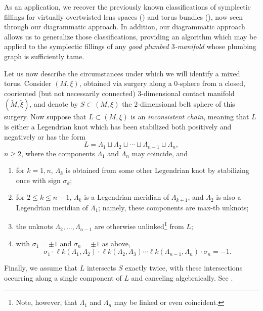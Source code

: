 \documentclass[11pt]{amsart}
\numberwithin{equation}{section}
\theoremstyle{plain}
\theoremstyle{definition}
\theoremstyle{remark}\newtheorem{rem}[equation]{Remark}%
\theoremstyle{remark}\newtheorem{obs}[equation]{Observation}%
\begin{document}
As an application, we recover the previously known classifications of symplectic fillings for virtually overtwisted lens spaces (\cite{etnyre2021symplectic,christian2023some}) and torus bundles (\cite{christian2021symplectic}), now seen through our diagrammatic approach.  In addition, our diagrammatic approach allows us to generalize those classifications, providing an algorithm which may be applied to the symplectic fillings of any \emph{good plumbed $3$-manifold} whose plumbing graph is sufficiently tame.

Let us now describe the circumstances under which we will identify a mixed torus.  Consider $(M,\xi)$, obtained via surgery along a 0-sphere from a closed, cooriented (but not necessarily connected) 3-dimensional contact manifold $(\tilde{M},\tilde{\xi})$, and denote by $S\subset (M,\xi)$ the 2-dimensional belt sphere of this surgery.  Now suppose that $L\subset(M,\xi)$ is an \emph{inconsistent chain}, meaning that $L$ is either a Legendrian knot which has been stabilized both positively and negatively or has the form
\[
L = \Lambda_1\sqcup \Lambda_2\sqcup\cdots\sqcup \Lambda_{n-1}\sqcup \Lambda_{n},
\]
$n\geq 2$, where the components $\Lambda_1$ and $\Lambda_n$ may coincide, and
\begin{enumerate}
    \item for $k=1,n$, $\Lambda_k$ is obtained from some other Legendrian knot by stabilizing once with sign $\sigma_k$;

    \item for $2\leq k\leq n-1$, $\Lambda_k$ is a Legendrian meridian of $\Lambda_{k+1}$, and $\Lambda_2$ is also a Legendrian meridian of $\Lambda_1$; namely, these components are max-tb unknots;
    
    \item the unknots $\Lambda_2,\ldots,\Lambda_{n-1}$ are otherwise unlinked\footnote{Note, however, that $\Lambda_1$ and $\Lambda_n$ may be linked or even coincident.} from $L$;
    
    \item with $\sigma_1=\pm 1$ and $\sigma_{n}=\pm 1$ as above,
    \[
    \sigma_1\cdot\ell k(\Lambda_1,\Lambda_2)\cdot\ell k(\Lambda_2,\Lambda_3)\cdots \ell k(\Lambda_{n-1},\Lambda_{n})\cdot \sigma_{n} = -1.
    \]
\end{enumerate}
Finally, we assume that $L$ intersects $S$ exactly twice, with these intersections occurring along a single component of $L$ and canceling algebraically.  See .
\end{document}
